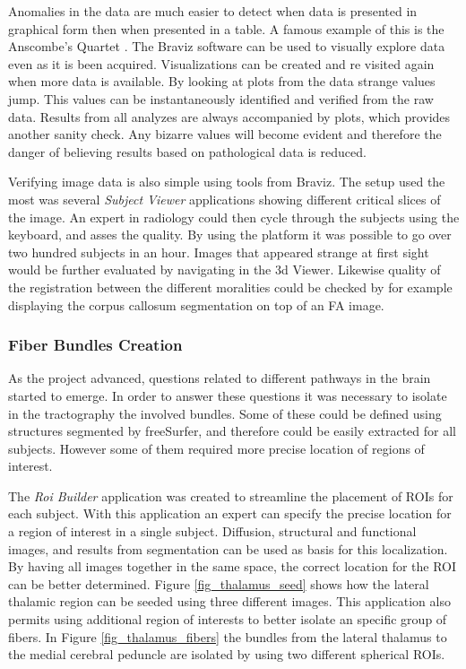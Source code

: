 Anomalies in the data are much easier to detect when data is presented in graphical form then when presented in a table. A famous example of this is the Anscombe's Quartet \autocite{anscombe_graphs_1973}. The Braviz software can be used to visually explore data even as it is been acquired. Visualizations can be created and re visited again when more data is available. By looking at plots from the data strange values jump. This values can be instantaneously identified and verified from the raw data. Results from all analyzes are always accompanied by plots, which provides another sanity check. Any bizarre values will become evident and therefore the danger of believing results based on pathological data is reduced.

Verifying image data is also simple using tools from Braviz. The setup used the most was several \emph{Subject Viewer} applications showing different critical slices of the image. An expert in radiology could then cycle through the subjects using the keyboard, and asses the quality. By using the platform it was possible to go over two hundred subjects in an hour. Images that appeared strange at first sight would be further evaluated by navigating in the 3d Viewer. Likewise quality of the registration between the different moralities could be checked by for example displaying the corpus callosum segmentation on top of an FA image. 

\subsubsection{Fiber Bundles Creation}

As the project advanced, questions related to different pathways in the brain started to emerge. In order to answer these questions it was necessary to isolate in the tractography the involved bundles. Some of these could be defined using structures segmented by freeSurfer, and therefore could be easily extracted for all subjects. However some of them required more precise location of regions of interest. 

The \emph{Roi Builder} application was created to streamline the placement of ROIs for each subject. With this application an expert can specify the precise location for a region of interest in a single subject. Diffusion, structural and functional images, and results from segmentation can be used as basis for this localization. By having all images together in the same space, the correct location for the ROI can be better determined. Figure \ref{fig_thalamus_seed} shows how the lateral thalamic region can be seeded using three different images.  This application also permits using additional region of interests to better isolate an specific group of fibers. In Figure \ref{fig_thalamus_fibers} the bundles from the lateral thalamus to the medial cerebral peduncle are isolated by using two different spherical ROIs. 

